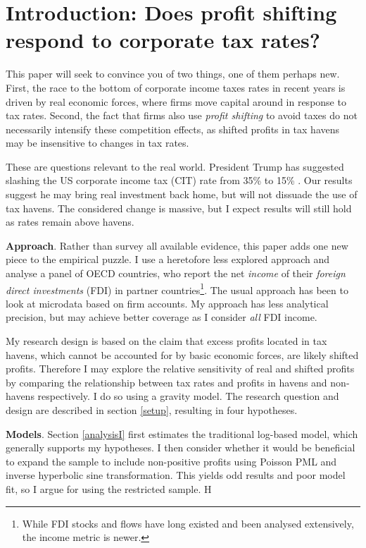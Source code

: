 \documentclass[twoside,a4paper,11pt]{article}
\begin{document}
\section{Introduction: Does profit shifting respond to corporate tax rates?}
This paper will seek to convince you of two things, one of them perhaps new. First, the race to the bottom of corporate income taxes rates in recent years is driven by real economic forces, where firms move capital around in response to tax rates. Second, the fact that firms also use \textit{profit shifting} to avoid taxes do not necessarily intensify these competition effects, as shifted profits in tax havens may be insensitive to changes in tax rates. 

These are questions relevant to the real world. President Trump has suggested slashing the US corporate income tax (CIT) rate from 35\% to 15\%  \autocite{the_atlantic_comprehensive_2017}. Our results suggest he may bring real investment back home, but will not dissuade the use of tax havens. The considered change is massive, but I expect results will still hold as rates remain above havens. 

\textbf{Approach}. Rather than survey all available evidence, this paper adds one new piece to the empirical puzzle. I use a heretofore less explored approach and analyse a panel of OECD countries, who report the net \textit{income} of their \textit{foreign direct investments} (FDI) in partner countries\footnote{While FDI stocks and flows have long existed and been analysed extensively, the income metric is newer.}. The usual approach has been to look at microdata based on firm accounts. My approach has less analytical precision, but may achieve better coverage as I consider \textit{all} FDI income. 
 
My research design is based on the claim that excess  profits located in tax havens, which cannot be accounted for by basic economic forces, are likely shifted profits. Therefore I may explore the relative sensitivity of real and shifted profits by comparing the relationship between tax rates and profits in havens and non-havens respectively. I do so using a gravity model. The research question and design are described in section \ref{setup}, resulting in four hypotheses. 

\textbf{Models}. Section \ref{analysisI} first estimates the traditional log-based model, which generally supports my hypotheses. I then consider whether it would be beneficial to expand the sample to include non-positive profits using Poisson PML and inverse hyperbolic sine transformation. This yields odd results and poor model fit, so I argue for using the  restricted sample. H
\end{document}
